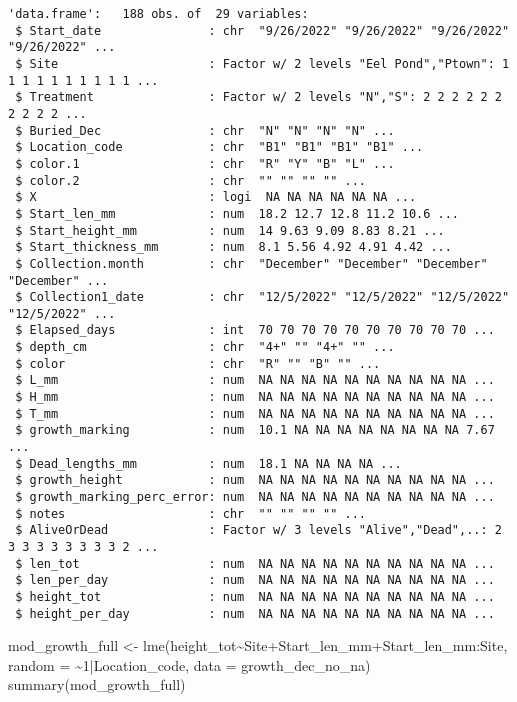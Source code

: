 \documentclass[
  letterpaper,
  DIV=11,
  numbers=noendperiod]{scrartcl}
\newenvironment{Shaded}{\begin{snugshade}}{\end{snugshade}}
\newcommand{\AttributeTok}[1]{\textcolor[rgb]{0.40,0.45,0.13}{#1}}
\newcommand{\DecValTok}[1]{\textcolor[rgb]{0.68,0.00,0.00}{#1}}
\newcommand{\FunctionTok}[1]{\textcolor[rgb]{0.28,0.35,0.67}{#1}}
\newcommand{\NormalTok}[1]{\textcolor[rgb]{0.00,0.23,0.31}{#1}}
\newcommand{\OtherTok}[1]{\textcolor[rgb]{0.00,0.23,0.31}{#1}}
\newcommand{\SpecialCharTok}[1]{\textcolor[rgb]{0.37,0.37,0.37}{#1}}
\begin{document}
\begin{verbatim}
'data.frame':   188 obs. of  29 variables:
 $ Start_date               : chr  "9/26/2022" "9/26/2022" "9/26/2022" "9/26/2022" ...
 $ Site                     : Factor w/ 2 levels "Eel Pond","Ptown": 1 1 1 1 1 1 1 1 1 1 ...
 $ Treatment                : Factor w/ 2 levels "N","S": 2 2 2 2 2 2 2 2 2 2 ...
 $ Buried_Dec               : chr  "N" "N" "N" "N" ...
 $ Location_code            : chr  "B1" "B1" "B1" "B1" ...
 $ color.1                  : chr  "R" "Y" "B" "L" ...
 $ color.2                  : chr  "" "" "" "" ...
 $ X                        : logi  NA NA NA NA NA NA ...
 $ Start_len_mm             : num  18.2 12.7 12.8 11.2 10.6 ...
 $ Start_height_mm          : num  14 9.63 9.09 8.83 8.21 ...
 $ Start_thickness_mm       : num  8.1 5.56 4.92 4.91 4.42 ...
 $ Collection.month         : chr  "December" "December" "December" "December" ...
 $ Collection1_date         : chr  "12/5/2022" "12/5/2022" "12/5/2022" "12/5/2022" ...
 $ Elapsed_days             : int  70 70 70 70 70 70 70 70 70 70 ...
 $ depth_cm                 : chr  "4+" "" "4+" "" ...
 $ color                    : chr  "R" "" "B" "" ...
 $ L_mm                     : num  NA NA NA NA NA NA NA NA NA NA ...
 $ H_mm                     : num  NA NA NA NA NA NA NA NA NA NA ...
 $ T_mm                     : num  NA NA NA NA NA NA NA NA NA NA ...
 $ growth_marking           : num  10.1 NA NA NA NA NA NA NA NA 7.67 ...
 $ Dead_lengths_mm          : num  18.1 NA NA NA NA ...
 $ growth_height            : num  NA NA NA NA NA NA NA NA NA NA ...
 $ growth_marking_perc_error: num  NA NA NA NA NA NA NA NA NA NA ...
 $ notes                    : chr  "" "" "" "" ...
 $ AliveOrDead              : Factor w/ 3 levels "Alive","Dead",..: 2 3 3 3 3 3 3 3 3 2 ...
 $ len_tot                  : num  NA NA NA NA NA NA NA NA NA NA ...
 $ len_per_day              : num  NA NA NA NA NA NA NA NA NA NA ...
 $ height_tot               : num  NA NA NA NA NA NA NA NA NA NA ...
 $ height_per_day           : num  NA NA NA NA NA NA NA NA NA NA ...
\end{verbatim}

\begin{Shaded}
\begin{Highlighting}[]
\NormalTok{mod\_growth\_full }\OtherTok{\textless{}{-}} \FunctionTok{lme}\NormalTok{(height\_tot}\SpecialCharTok{\textasciitilde{}}\NormalTok{Site}\SpecialCharTok{+}\NormalTok{Start\_len\_mm}\SpecialCharTok{+}\NormalTok{Start\_len\_mm}\SpecialCharTok{:}\NormalTok{Site, }
                       \AttributeTok{random =} \SpecialCharTok{\textasciitilde{}}\DecValTok{1}\SpecialCharTok{|}\NormalTok{Location\_code, }\AttributeTok{data =}\NormalTok{ growth\_dec\_no\_na)}
\FunctionTok{summary}\NormalTok{(mod\_growth\_full)}
\end{Highlighting}
\end{Shaded}
\end{document}
